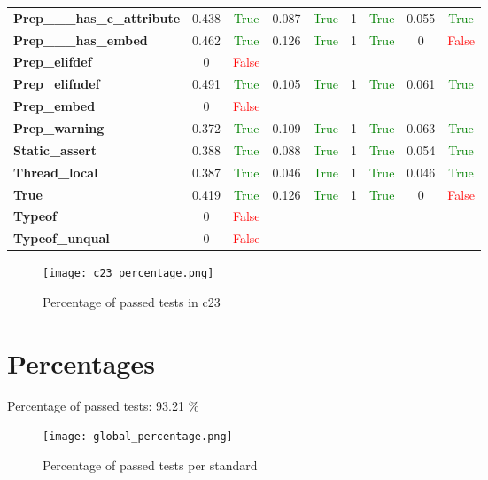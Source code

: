 \documentclass{article}
\begin{document}
\begin{xltabular}{\textwidth}{lcccccccc}
\textbf{{\fontsize{10}{12}\selectfont Prep\_\_\_has\_c\_attribute}}& 0.438&\textcolor{green}{True}& 0.087&\textcolor{green}{True}& 1&\textcolor{green}{True}& 0.055&\textcolor{green}{True} \\[0.5ex]
\textbf{{\fontsize{10}{12}\selectfont Prep\_\_\_has\_embed}}& 0.462&\textcolor{green}{True}& 0.126&\textcolor{green}{True}& 1&\textcolor{green}{True}& 0&\textcolor{red}{False} \\[0.5ex]
\textbf{{\fontsize{10}{12}\selectfont Prep\_elifdef}}& 0&\textcolor{red}{False} \\[0.5ex]
\textbf{{\fontsize{10}{12}\selectfont Prep\_elifndef}}& 0.491&\textcolor{green}{True}& 0.105&\textcolor{green}{True}& 1&\textcolor{green}{True}& 0.061&\textcolor{green}{True} \\[0.5ex]
\textbf{{\fontsize{10}{12}\selectfont Prep\_embed}}& 0&\textcolor{red}{False} \\[0.5ex]
\textbf{{\fontsize{10}{12}\selectfont Prep\_warning}}& 0.372&\textcolor{green}{True}& 0.109&\textcolor{green}{True}& 1&\textcolor{green}{True}& 0.063&\textcolor{green}{True} \\[0.5ex]
\textbf{{\fontsize{10}{12}\selectfont Static\_assert}}& 0.388&\textcolor{green}{True}& 0.088&\textcolor{green}{True}& 1&\textcolor{green}{True}& 0.054&\textcolor{green}{True} \\[0.5ex]
\textbf{{\fontsize{10}{12}\selectfont Thread\_local}}& 0.387&\textcolor{green}{True}& 0.046&\textcolor{green}{True}& 1&\textcolor{green}{True}& 0.046&\textcolor{green}{True} \\[0.5ex]
\textbf{{\fontsize{10}{12}\selectfont True}}& 0.419&\textcolor{green}{True}& 0.126&\textcolor{green}{True}& 1&\textcolor{green}{True}& 0&\textcolor{red}{False} \\[0.5ex]
\textbf{{\fontsize{10}{12}\selectfont Typeof}}& 0&\textcolor{red}{False} \\[0.5ex]
\textbf{{\fontsize{10}{12}\selectfont Typeof\_unqual}}& 0&\textcolor{red}{False} \\[0.5ex]
\bottomrule
\end{xltabular}
\newpage
\begin{figure}[h!]
\centering
\texttt{[image: c23\_percentage.png]}
\caption{Percentage of passed tests in c23}
\label{fig:c23_percentage}
\end{figure}
\newpage
\section{Percentages}Percentage of passed tests:
93.21 \%\begin{figure}[h!]
\centering
\texttt{[image: global\_percentage.png]}
\caption{Percentage of passed tests per standard}
\label{fig:global_percentage}
\end{figure}
\end{document}
